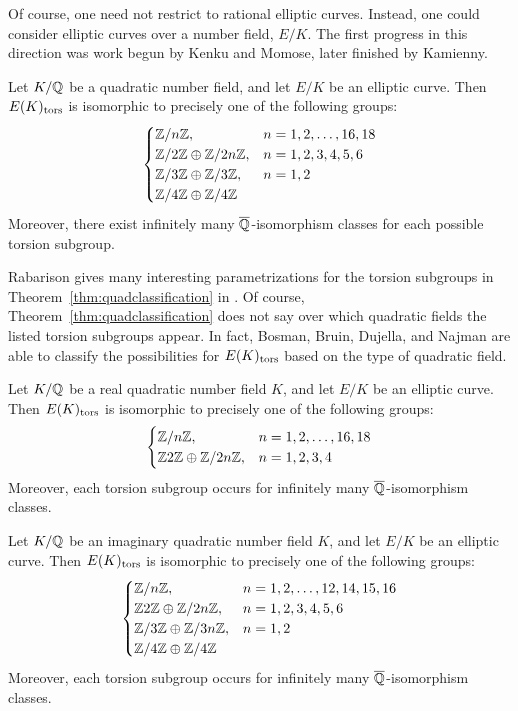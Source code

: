 Of course, one need not restrict to rational elliptic curves. Instead, one could consider elliptic curves over a number field, $E/K$. The first progress in this direction was work begun by Kenku and Momose, later finished by Kamienny.


\begin{thm} \label{thm:quadclassification}
Let $K/\mathbb{Q}$ be a quadratic number field, and let $E/K$ be an elliptic curve. Then $E(K)_{\text{tors}}$ is isomorphic to precisely one of the following groups:
	\[
	\begin{cases}
	\mathbb{Z}/n\mathbb{Z}, & n= 1,2, \ldots, 16, 18 \\
	\mathbb{Z}/2\mathbb{Z} \oplus \mathbb{Z}/2n\mathbb{Z}, & n = 1, 2, 3, 4, 5, 6 \\
	\mathbb{Z}/3\mathbb{Z} \oplus \mathbb{Z}/3\mathbb{Z}, & n= 1, 2 \\
	\mathbb{Z}/4\mathbb{Z} \oplus \mathbb{Z}/4\mathbb{Z}
	\end{cases}
	\]
Moreover, there exist infinitely many $\overline{\mathbb{Q}}$-isomorphism classes for each possible torsion subgroup. 
\end{thm}


Rabarison gives many interesting parametrizations for the torsion subgroups in Theorem~\ref{thm:quadclassification} in \cite{rabarison10}. Of course, Theorem~\ref{thm:quadclassification} does not say over which quadratic fields the listed torsion subgroups appear. In fact, Bosman, Bruin, Dujella, and Najman are able to classify the possibilities for $E(K)_{\text{tors}}$ based on the type of quadratic field. 


\begin{thm} \label{thm:quadclasstype1}
Let $K/\mathbb{Q}$ be a real quadratic number field $K$, and let $E/K$ be an elliptic curve. Then $E(K)_{\text{tors}}$ is isomorphic to precisely one of the following groups:
	\[
	\begin{cases}
	\mathbb{Z}/n\mathbb{Z}, & n= 1, 2, \ldots, 16, 18 \\
	\mathbb{Z}2\mathbb{Z} \oplus \mathbb{Z}/2n\mathbb{Z}, & n= 1, 2, 3, 4
	\end{cases}
	\]
Moreover, each torsion subgroup occurs for infinitely many $\overline{\mathbb{Q}}$-isomorphism classes.
\end{thm}


\begin{thm} \label{thm:quadclasstype2}
Let $K/\mathbb{Q}$ be an imaginary quadratic number field $K$, and let $E/K$ be an elliptic curve. Then $E(K)_{\text{tors}}$ is isomorphic to precisely one of the following groups:
	\[
	\begin{cases}
	\mathbb{Z}/n\mathbb{Z}, & n= 1, 2, \ldots, 12, 14, 15, 16 \\
	\mathbb{Z}2\mathbb{Z} \oplus \mathbb{Z}/2n\mathbb{Z}, & n= 1, 2, 3, 4, 5, 6 \\
	\mathbb{Z}/3\mathbb{Z} \oplus \mathbb{Z}/3n\mathbb{Z}, & n= 1, 2 \\
	\mathbb{Z}/4\mathbb{Z} \oplus \mathbb{Z}/4\mathbb{Z}
	\end{cases}
	\]
Moreover, each torsion subgroup occurs for infinitely many $\overline{\mathbb{Q}}$-isomorphism classes.
\end{thm}


